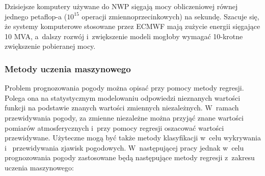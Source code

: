 Dzisiejsze komputery używane do NWP sięgają mocy obliczeniowej równej jednego petaflop-a ($10^{15}$ operacji
zmiennoprzecinkowych) na sekundę. Szacuje się, że systemy komputerowe stosowane przez ECMWF mają zużycie energii
sięgające 10 MVA, a~dalszy rozwój i~zwiększenie modeli mogłoby wymagać 10-krotne zwiększenie pobieranej mocy.

\subsubsection*{Metody uczenia maszynowego}

Problem prognozowania pogody można opisać przy pomocy metody regresji. Polega ona
na statystycznym modelowaniu odpowiedzi nieznanych wartości funkcji na podstawie
znanych wartości zmiennych niezależnych. W~ramach przewidywania pogody, za zmienne niezależne
można przyjąć znane wartości pomiarów atmosferycznych i~przy pomocy regresji oszacować 
wartości przewidywane. Użyteczne mogą być także metody klasyfikacji w~celu wykrywania i~
przewidywania zjawisk pogodowych. W~następującej pracy jednak w~celu prognozowania pogody
zastosowane będą następujące metody regresji z~zakresu uczenia maszynowego:


